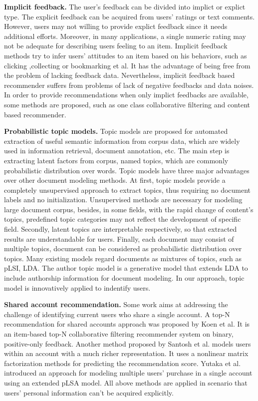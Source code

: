 \documentclass{llncs}
\begin{document}
\textbf{Implicit feedback.} The user's feedback can be divided into implict  or explict type. The explicit feedback can be acquired from users' ratings or text comments. However,  users may not willing to provide explict feedback since it needs additional efforts. Moreover, in many applications, a single numeric rating may not be adequate for describing users feeling to an item. Implicit feedback methods\cite{song:mining} try to infer users' attitudes to an item based on his behaviors, such as clicking ,collecting or bookmarking et al. It has the advantage of being free from the problem of lacking feedback data. Nevertheless, implicit feedback based recommender suffers from problems of lack of negative feedbacks and data noises. In order to provide recommendations when only implict feedbacks are available, some methods are proposed, such as one class collaborative filtering and content based recommender.\par


\textbf{Probabilistic topic models.}  Topic models\cite{blei:lda}\cite{mic:atm}\cite{mark:prob} are proposed for automated extraction of useful semantic information from corpus data, which are widely used in information retrieval, document annotation, etc. The main step is extracting latent factors from corpus, named topics, which are commonly probabilistic distribution over words. Topic models have three major advantages over other document modeling methods. At first, topic models provide a completely unsupervised approach to extract topics, thus requiring no document labels and no initialization. Unsupervised methods are necessary for modeling large document corpus, besides, in some fields, with the rapid change of content's topics, predefined topic categories may not reflect the development of specific field. Secondly, latent topics are interpretable respectively, so that extracted results are understandable for users. Finally, each document may consist of multiple topics, document can be considered as probabilistic distribution over topics. Many existing models regard documents as mixtures of topics, such as pLSI, LDA. The author topic model is a generative model that extends LDA to include authorship information for document modeling. In our approach, topic model is innovatively applied to indentify users. \par

\textbf{Shared account recommendation.} Some work aims at addressing the challenge of identifying current users who share a single account. A top-N recommendation for shared accounts approach was proposed by Koen et al.\cite{koen:top-n} It is an item-based top-N collaborative filtering recommender system on binary, positive-only feedback. Another method proposed by Santosh et al.\cite{kabbur:nlmf} models users within an account with a much richer representation. It uses a nonlinear matrix factorization methods for predicting the recommendation score. Yutaka et al.\cite{yutaka:modeling} introduced an approach for modeling multiple users' purchase in a single account using an extended pLSA model. All above methods are applied in scenario that users' personal information can't be acquired explicitly.
\end{document}
